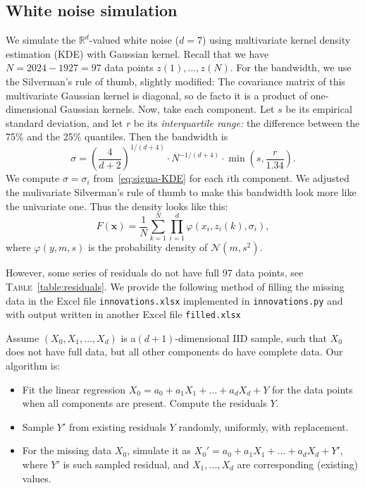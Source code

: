 \documentclass[12pt]{amsart}
\begin{document}
\subsection{White noise simulation}  We simulate the $\mathbb R^d$-valued white noise ($d = 7$) using multivariate kernel density estimation (KDE) with Gaussian kernel. Recall that we have $N = 2024 - 1927 = 97$ data points $z(1), \ldots, z(N)$. For the bandwidth, we use the Silverman's rule of thumb, slightly modified: The covariance matrix of this multivariate Gaussian kernel is diagonal, so de facto it is a product of one-dimensional Gaussian kernels. Now, take each component. Let $s$ be its empirical standard deviation, and let $r$ be its {\it interquartile range:} the difference between the 75\% and the 25\% quantiles. Then the bandwidth is 
\begin{equation}
\label{eq:sigma-KDE}
\sigma = \left(\frac{4}{d+2}\right)^{1/(d + 4)} \cdot N^{-1/(d + 4)}\cdot \min\left(s, \frac{r}{1.34}\right).
\end{equation}
We compute $\sigma = \sigma_i$ from~\eqref{eq:sigma-KDE} for each $i$th component. We adjusted the mulivariate Silverman's rule of thumb to make this bandwidth look more like the univariate one. Thus the density looks like this:
$$
F(\mathbf{x}) = \frac1N\sum\limits_{k=1}^N\prod\limits_{i=1}^d\varphi(x_i, z_i(k), \sigma_i),
$$
where $\varphi(y, m, s)$  is the probability density of $\mathcal N(m, s^2)$. 

However, some series of residuals do not have full 97 data points, see \textsc{Table}~\ref{table:residuals}. We provide the following method of filling the missing data in the Excel file \texttt{innovations.xlsx} implemented in \texttt{innovations.py} and with output written in another Excel file \texttt{filled.xlsx}

Assume $(X_0, X_1, \ldots, X_d)$ is a$(d+1)$-dimensional IID sample, such that $X_0$ does not have full data, but all other components  do have complete data. Our algorithm is:

\begin{itemize}
\item Fit the linear regression $X_0 = a_0 + a_1X_1 + \ldots + a_dX_d + Y$ for the data points when all components are present. Compute the residuals $Y$. 
\item Sample $Y'$ from existing residuals $Y$ randomly, uniformly, with replacement.
\item For the missing data $X_0$, simulate it as $X_0' = a_0 + a_1X_1 + \ldots + a_dX_d + Y'$, where $Y'$ is such sampled residual, and $X_1, \ldots, X_d$ are corresponding (existing) values. 
\end{itemize}
\end{document}
